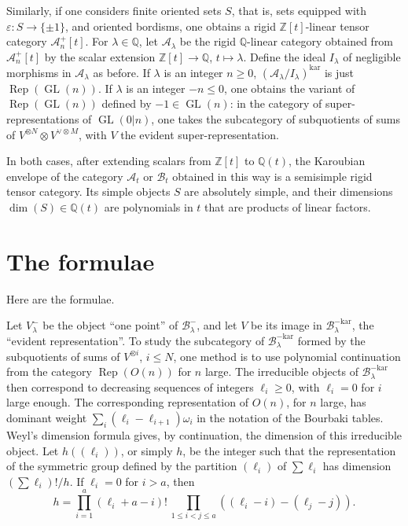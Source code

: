 \documentclass[11pt,a4paper]{article}
\DeclareMathOperator{\Rep}{Rep}
\DeclareMathOperator{\GL}{GL}
\newcommand{\Q}{\mathbb{Q}}
\newcommand{\Z}{\mathbb{Z}}
\begin{document}
Similarly, if one considers finite oriented sets $S$, that is, sets equipped with $\varepsilon:S\to\{\pm1\}$, and oriented bordisms, one obtains a rigid $\Z[t]$-linear tensor category $\mathcal A_n^+[t]$. For $\lambda\in\Q$, let $\mathcal A_\lambda$ be the rigid $\Q$-linear category obtained from $\mathcal A_n^+[t]$ by the scalar extension $\Z[t]\to\Q$, $t\mapsto\lambda$. Define the ideal $I_\lambda$ of negligible morphisms in $\mathcal A_\lambda$ as before. If $\lambda$ is an integer $n\geq0$, $(\mathcal A_\lambda/I_\lambda)^{\mathrm{kar}}$ is just $\Rep(\GL(n))$. If $\lambda$ is an integer $-n\leq0$, one obtains the variant of $\Rep(\GL(n))$ defined by $-1\in\GL(n)$: in the category of super-representations of $\GL(0|n)$, one takes the subcategory of subquotients of sums of $V^{\otimes N}\otimes V^{\vee\otimes M}$, with $V$ the evident super-representation.

In both cases, after extending scalars from $\Z[t]$ to $\Q(t)$, the Karoubian envelope of the category $\mathcal A_t$ or $\mathcal B_t$ obtained in this way is a semisimple rigid tensor category. Its simple objects $S$ are absolutely simple, and their dimensions $\dim(S)\in\Q(t)$ are polynomials in $t$ that are products of linear factors.

\section*{The formulae}

Here are the formulae.

Let $V_\lambda^-$ be the object ``one point'' of $\mathcal B_\lambda^-$, and let $V$ be its image in $\mathcal B_\lambda^{-\mathrm{kar}}$, the ``evident representation''. To study the subcategory of $\mathcal B_\lambda^{-\mathrm{kar}}$ formed by the subquotients of sums of $V^{\otimes i}$, $i\leq N$, one method is to use polynomial continuation from the category $\Rep(O(n))$ for $n$ large. The irreducible objects of $\mathcal B_\lambda^{-\mathrm{kar}}$ then correspond to decreasing sequences of integers $\ell_i\geq0$, with $\ell_i=0$ for $i$ large enough. The corresponding representation of $O(n)$, for $n$ large, has dominant weight $\sum_i(\ell_i-\ell_{i+1})\omega_i$ in the notation of the Bourbaki tables. Weyl's dimension formula gives, by continuation, the dimension of this irreducible object. Let $h((\ell_i))$, or simply $h$, be the integer such that the representation of the symmetric group defined by the partition $(\ell_i)$ of $\sum\ell_i$ has dimension $(\sum\ell_i)!/h$. If $\ell_i=0$ for $i>a$, then
\[
h=\prod_{i=1}^a(\ell_i+a-i)!\,\prod_{1\leq i<j\leq a}((\ell_i-i)-(\ell_j-j)).
\]
\end{document}
